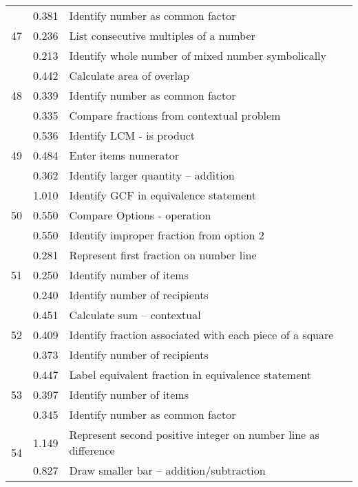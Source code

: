 \begin{longtable}[c]{|c|c|l|}
\hline
\multirow{3}{*}{\small 47} & \small 0.381 & \small Identify number as common factor \\
 & \small 0.236 & \small List consecutive multiples of a number \\
 & \small 0.213 & \small Identify whole number of mixed number symbolically \\
\hline
\multirow{3}{*}{\small 48} & \small 0.442 & \small Calculate area of overlap \\
 & \small 0.339 & \small Identify number as common factor \\
 & \small 0.335 & \small Compare fractions from contextual problem \\
\hline
\multirow{3}{*}{\small 49} & \small 0.536 & \small Identify LCM - is product \\
 & \small 0.484 & \small Enter items numerator \\
 & \small 0.362 & \small Identify larger quantity -- addition \\
\hline
\multirow{3}{*}{\small 50} & \small 1.010 & \small Identify GCF in equivalence statement \\
 & \small 0.550 & \small Compare Options - operation \\
 & \small 0.550 & \small Identify improper fraction from option 2 \\
\hline
\multirow{3}{*}{\small 51} & \small 0.281 & \small Represent first fraction on number line \\
 & \small 0.250 & \small Identify number of items \\
 & \small 0.240 & \small Identify number of recipients \\
\hline
\multirow{3}{*}{\small 52} & \small 0.451 & \small Calculate sum -- contextual \\
 & \small 0.409 & \small Identify fraction associated with each piece of a square \\
 & \small 0.373 & \small Identify number of recipients \\
\hline
\multirow{3}{*}{\small 53} & \small 0.447 & \small Label equivalent fraction in equivalence statement \\
 & \small 0.397 & \small Identify number of items \\
 & \small 0.345 & \small Identify number as common factor \\
\hline
\multirow{3}{*}{\small 54} & \small 1.149 & \small Represent second positive integer on number line as difference \\
 & \small 0.827 & \small Draw smaller bar -- addition/subtraction \\

\end{longtable}
